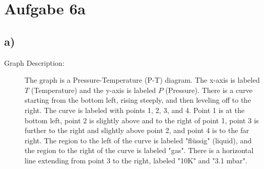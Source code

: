 \section*{Aufgabe 6a}



\subsection*{a)}

\begin{description}
    \item[Graph Description:] The graph is a Pressure-Temperature (P-T) diagram. The x-axis is labeled \( T \) (Temperature) and the y-axis is labeled \( P \) (Pressure). There is a curve starting from the bottom left, rising steeply, and then leveling off to the right. The curve is labeled with points 1, 2, 3, and 4. Point 1 is at the bottom left, point 2 is slightly above and to the right of point 1, point 3 is further to the right and slightly above point 2, and point 4 is to the far right. The region to the left of the curve is labeled "flüssig" (liquid), and the region to the right of the curve is labeled "gas". There is a horizontal line extending from point 3 to the right, labeled "10K" and "3.1 mbar".
\end{description}
